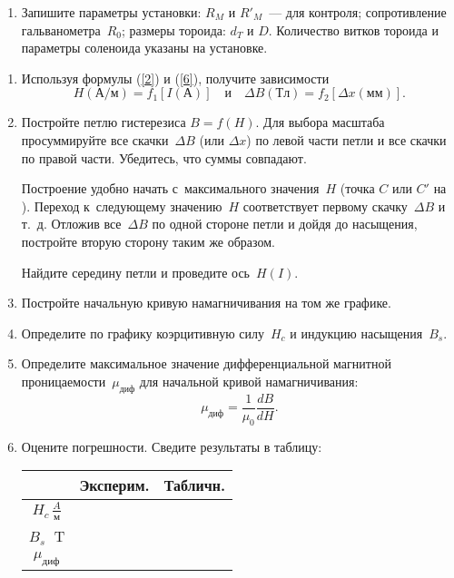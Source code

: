 \begin{lab:task}
\begin{enumerate}
	\item Запишите параметры установки: $R_M$ и $R'_M$~--- для контроля; сопротивление гальванометра~$R_0$; размеры тороида:
	$d_T$ и $D$. Количество витков тороида и параметры соленоида указаны на установке.
	
	\end{enumerate}	
	
	
	\begin{enumerate}
	
		\item Используя формулы (\eqref{2}) и (\eqref{6}), получите зависимости
		\begin{equation*}
			H(А/м)=f_1[I(А)]\quad и\quad \Delta B(Тл)=f_2[\Delta x(мм)].
		\end{equation*}
		
		\item Постройте петлю гистерезиса $B=f(H)$. Для выбора масштаба просуммируйте все скачки~$\Delta B$ (или $\Delta x$) по левой части
		петли и все скачки по правой части. Убедитесь, что суммы совпадают.
		
		Построение удобно начать с~максимального значения~$H$ (точка $C$ или $C'$ на ). Переход к~следующему значению~$H$
		соответствует первому скачку~$\Delta B$ и т.~д. Отложив все~$\Delta B$ по одной стороне петли и дойдя до насыщения, постройте
		вторую сторону таким же образом.
		
		Найдите середину петли и проведите ось~$H(I)$.
		
		\item Постройте начальную кривую намагничивания на том же графике.
		
		\item Определите по графику коэрцитивную силу~$H_c$ и индукцию насыщения~$B_s$.
		
		\item Определите максимальное значение дифференциальной магнитной проницаемости~$\mu_{диф}$ для начальной кривой
		намагничивания:
		\begin{equation*}
			\mu_{диф}=\frac{1}{\mu_0}\frac{dB}{dH}.
		\end{equation*}
		
		\item Оцените погрешности. Сведите результаты в таблицу:
		
		\begin{center}
		\begin{tabular}{|c|c|c|}
		\hline
		&Эксперим.&Табличн.\\
		\hline\hline
		$H_c\,\frac{A}{м}$& & \\
		$B_s\;$ T & & \\
		$\mu_{диф}$ & & \\
		\hline
		\end{tabular}
		\end{center}

	\end{enumerate}

\end{lab:task}

